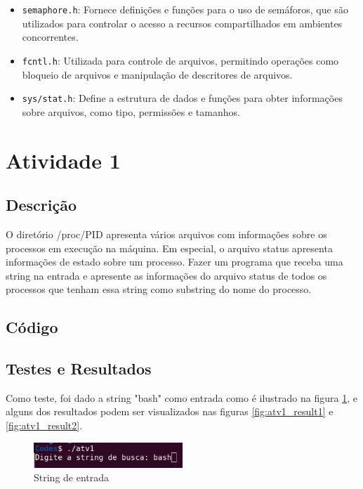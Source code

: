 \documentclass{article}
\begin{document}
\begin{itemize}
    \item \texttt{semaphore.h}: Fornece definições e funções para o uso de semáforos, que são utilizados para controlar o acesso a recursos compartilhados em ambientes concorrentes.
    
    \item \texttt{fcntl.h}: Utilizada para controle de arquivos, permitindo operações como bloqueio de arquivos e manipulação de descritores de arquivos.
    
    \item \texttt{sys/stat.h}: Define a estrutura de dados e funções para obter informações sobre arquivos, como tipo, permissões e tamanhos.
\end{itemize}

\section{Atividade 1}
\subsection{Descrição}
O diretório /proc/PID apresenta vários arquivos com informações sobre os processos em execução na máquina. Em especial, o arquivo status apresenta informações de estado sobre um processo. Fazer um programa que receba uma string na entrada e apresente as informações do arquivo status de todos os processos que tenham essa string como substring do nome do processo.
\subsection{Código}

\subsection{Testes e Resultados}
Como teste, foi dado a string "bash" como entrada como é ilustrado na figura \ref{fig:atv1_entrada}, e alguns dos resultados podem ser visualizados nas figuras \ref{fig:atv1_result1} e \ref{fig:atv1_result2}.

\begin{figure}[ht]
    \centering
    \includegraphics[width=0.5\textwidth]{./Images/atv1_entrada.png}
    \caption{String de entrada}
    \label{fig:atv1_entrada}
\end{figure}
\end{document}
